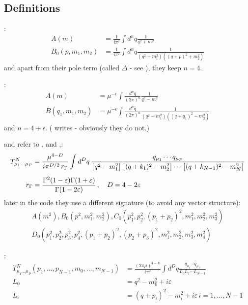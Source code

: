 \subsection{Definitions}\label{sec:defs}
\cite{Passarino:1978jh}:
\begin{align}
A(m) &= \frac 1 {i\pi^2}\int d^nq\frac 1 {q^2+m^2}\\
B_0(p,m_1,m_2) &= \frac 1 {i\pi^2}\int d^nq\frac 1 {(q^2+m_1^2)((q+p)^2+m_2^2)}
\end{align}
and apart from their pole term (called $\Delta$ - see \cite[eq. D.1]{Passarino:1978jh}), they keep $n=4$.

\cite{PhysRevD4054,Bojak:2000eu}:
\begin{align}
A(m) &= \mu^{-\epsilon}\int\frac{d^nq}{(2\pi)^n} \frac 1 {q^2-m^2}\\
B(q_1,m_1,m_2) &= \mu^{-\epsilon}\int\frac{d^nq}{(2\pi)^n} \frac 1 {(q^2-m_1^2)((q+q_1)^2-m_2^2)}
\end{align}
and $n=4+\epsilon$. (\cite{PhysRevD4054} writes  - obviously they do not.)

\HEPMath\cite{wiebusch_hepmath_2015} and \FeynCalc\cite{Mertig:1990an,Shtabovenko:2016sxi} refer to \LoopTools\cite{Hahn:1998yk,LoopTools212Guide}. \cite[eq. (1.1)]{LoopTools212Guide} and \cite[eq. (2.6)]{Ellis:2011cr},\QCDLoop\cite{Ellis:2007qk}:
\begin{align}
T_{\mu_1\ldots\mu_P}^N &=
\frac{\mu^{4 - D}}{i\pi^{D/2}\,r_\Gamma}
\int d^Dq\,
\frac{q_{\mu_1}\cdots q_{\mu_P}}
  {\bigl[q^2 - m_1^2\bigr]\,
   \bigl[(q + k_1)^2 - m_2^2\bigr] \cdots
   \bigl[(q + k_{N - 1})^2 - m_N^2\bigr]} \\[1ex]
\notag
r_\Gamma &= \frac{\Gamma^2(1 - \varepsilon)\Gamma(1+\varepsilon)}
  {\Gamma(1 - 2\varepsilon)}\,,
\quad D = 4 - 2\varepsilon\,
\end{align}
later in the code they use a different signature (to avoid any vector structure):
\begin{align}
A(m^2), B_0(p^2,m_1^2,m_2^2), C_0(p_1^2,p_2^2,(p_1+p_2)^2,m_1^2,m_2^2,m_3^2)\nonumber\\
D_0(p_1^2,p_2^2,p_3^2,p_4^2,(p_1+p_2)^2,(p_2+p_3)^2,m_1^2,m_2^2,m_3^2,m_4^2)
\end{align}

\cite{Denner:2005nn}:
\begin{align}
T_{\mu_1\ldots\mu_P}^N(p_1,\ldots,p_{N-1},m_0,\ldots,m_{N-1}) &= \frac{(2\pi\mu)^{4-D}}{i\pi^2}\int d^Dq \frac{q_{\mu_1}\cdots q_{\mu_P}}{L_0 L_1 \cdots L_{N-1}}\\
L_0 &= q^2-m_0^2 +i\varepsilon\\
L_i &= (q+p_i)^2-m_i^2+i\varepsilon \, i=1,\ldots,N-1
\end{align}

